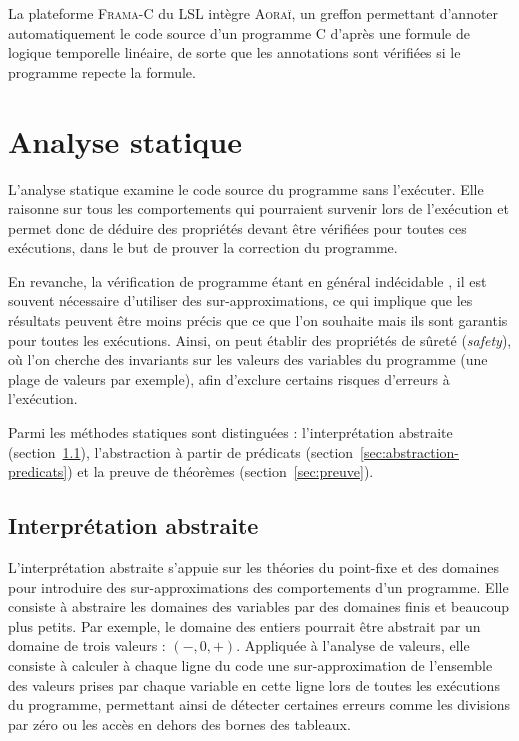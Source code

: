 \documentclass[french]{spimufcphdthesis}
\begin{document}
La plateforme \textsc{Frama-C} du LSL intègre \textsc{Aoraï}, un greffon
permettant d'annoter automatiquement le code source d'un programme C d'après
une formule de logique temporelle linéaire, de sorte que les annotations sont
vérifiées si le programme repecte la formule.


\section{Analyse statique}
\label{sec:AS}


L'analyse statique \cite{static-analysis} examine le code source du programme
sans l'exécuter. Elle raisonne sur tous les comportements qui pourraient
survenir lors de l'exécution et permet donc de déduire des propriétés devant
être vérifiées pour toutes ces exécutions, dans le but de prouver la correction
du programme.

En revanche, la vérification de programme étant en général indécidable
\cite{undecidability}, il est souvent nécessaire d'utiliser des
sur-approximations, ce qui implique que les résultats peuvent être moins précis
que ce que l'on souhaite mais ils sont garantis pour toutes les exécutions.
Ainsi, on peut établir des propriétés de sûreté ({\em safety}), où l’on cherche
des invariants sur les valeurs des variables du programme (une plage de valeurs
par exemple), afin d'exclure certains risques d'erreurs à l'exécution.

Parmi les méthodes statiques sont distinguées : l'interprétation abstraite
(section~\ref{sec:interpretation-abstraite}), l'abstraction à partir de
prédicats (section~\ref{sec:abstraction-predicats}) et la preuve de théorèmes
(section~\ref{sec:preuve}).


\subsection{Interprétation abstraite}
\label{sec:interpretation-abstraite}

L'interprétation abstraite \cite{abstract-interpretation} s'appuie sur les
théories du point-fixe et des domaines pour introduire des sur-approximations
des comportements d'un programme. Elle consiste à abstraire les domaines des
variables par des domaines finis et beaucoup plus petits. Par exemple, le
domaine des entiers pourrait être abstrait par un domaine de trois valeurs :
$(-, 0, +)$. Appliquée à l’analyse de valeurs, elle consiste à calculer à
chaque ligne du code une sur-approximation de l’ensemble des valeurs prises par
chaque variable en cette ligne lors de toutes les exécutions du programme,
permettant ainsi de détecter certaines erreurs comme les divisions par zéro ou
les accès en dehors des bornes des tableaux.
\end{document}
